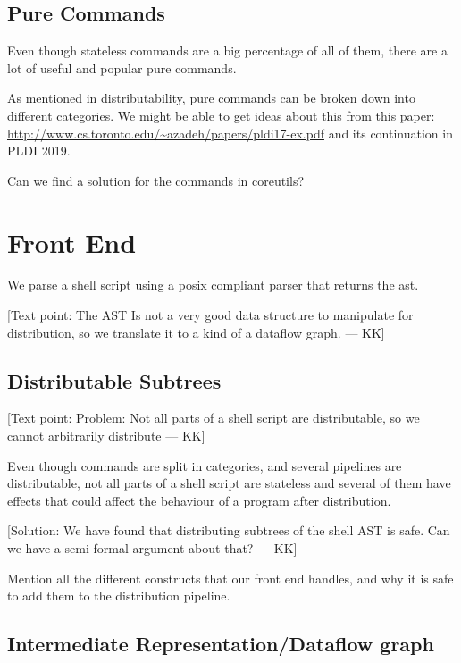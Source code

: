 \documentclass[sigplan,10pt,review,anonymous]{acmart}
\newcommand{\kk}[1]{[{\color{magenta}#1 --- KK}]}
\begin{document}
\subsection{Pure Commands}

Even though stateless commands are a big percentage of all of them,
there are a lot of useful and popular pure commands.

As mentioned in distributability, pure commands can be broken down
into different categories. We might be able to get ideas about this
from this paper:
\url{http://www.cs.toronto.edu/~azadeh/papers/pldi17-ex.pdf} and its
continuation in PLDI 2019.

Can we find a solution for the commands in coreutils?




\section{Front End}


We parse a shell script using a posix compliant parser that returns
the ast.

\kk{Text point: The AST Is not a very good data structure to
  manipulate for distribution, so we translate it to a kind of a
  dataflow graph.}

\subsection{Distributable Subtrees}

\kk{Text point: Problem: Not all parts of a shell script are
  distributable, so we cannot arbitrarily distribute}

Even though commands are split in categories, and several pipelines
are distributable, not all parts of a shell script are stateless and
several of them have effects that could affect the behaviour of a
program after distribution.

\kk{Solution: We have found that distributing subtrees of the shell
  AST is safe. Can we have a semi-formal argument about that?}

Mention all the different constructs that our front end handles, and
why it is safe to add them to the distribution pipeline.

\subsection{Intermediate Representation/Dataflow graph}
\end{document}
